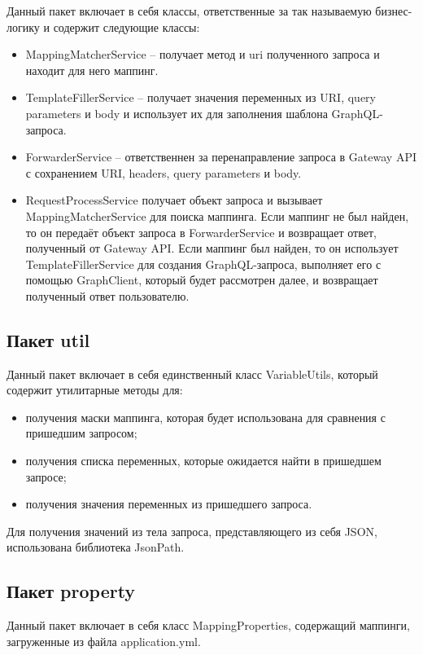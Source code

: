 Данный пакет включает в себя классы, ответственные за так называемую бизнес-логику и содержит следующие классы:

\begin{itemize}
	\item MappingMatcherService – получает метод и uri полученного запроса и находит для него маппинг.
	\item TemplateFillerService – получает значения переменных из URI, query parameters и body и использует их для заполнения шаблона GraphQL-запроса.
	\item ForwarderService – ответственнен за перенаправление запроса в Gateway API с сохранением URI, headers, query parameters и body.
	\item RequestProcessService получает объект запроса и вызывает MappingMatcherService для поиска маппинга.
	Если маппинг не был найден, то он передаёт объект запроса в ForwarderService и возвращает ответ, полученный от Gateway API. Если маппинг был найден, то он использует TemplateFillerService для создания GraphQL-запроса, выполняет его с помощью GraphClient, который будет рассмотрен далее, и возвращает полученный ответ пользователю.
\end{itemize}


\subsection{Пакет util}

Данный пакет включает в себя единственный класс VariableUtils, который содержит утилитарные методы для:

\begin{itemize}
	\item получения маски маппинга, которая будет использована для сравнения с пришедшим запросом;
	\item получения списка переменных, которые ожидается найти в пришедшем запросе;
	\item получения значения переменных из пришедшего запроса.
\end{itemize}

Для получения значений из тела запроса, представляющего из себя JSON, использована библиотека JsonPath.

\subsection{Пакет property}

Данный пакет включает в себя класс MappingProperties, содержащий маппинги, загруженные из файла application.yml.

